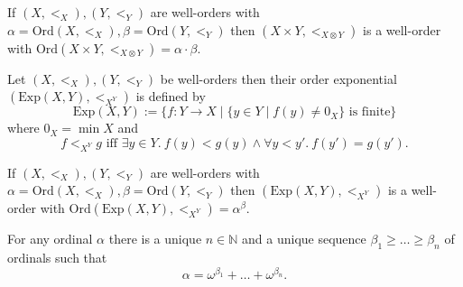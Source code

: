 \documentclass{whrartcl}
\newcommand{\NN}{\mathbb{N}}
\newcommand{\ord}{\text{Ord}}
\newcommand{\Exp}{\text{Exp}}
\begin{document}
\begin{proposition}
  If $(X, <_X), (Y, <_Y)$ are well-orders with $\alpha = \ord(X, <_X), \beta =
  \ord(Y, <_Y)$ then $(X \times Y, <_{X \otimes Y})$ is a well-order with $\ord(X \times Y,
  <_{X \otimes Y}) = \alpha \cdot \beta$.
\end{proposition}

\begin{definition}
  Let $(X, <_X), (Y, <_Y)$ be well-orders then their order exponential $(\Exp(X,
  Y), <_{X^Y})$ is defined by
  \[
    \Exp(X, Y) := \{f : Y \to X \mid \{y \in Y \mid f(y) \neq 0_X\} \text{ is finite} \}
  \]
  where $0_X = \min X$ and
  \[
    f <_{X^Y} g \text{ iff } \exists y \in Y.~f(y) < g(y) \wedge \forall y <
    y'.~f(y') = g(y').
  \]
\end{definition}

\begin{proposition}
  If $(X, <_X), (Y, <_Y)$ are well-orders with $\alpha = \ord(X, <_X), \beta =
  \ord(Y, <_Y)$ then $(\Exp(X, Y), <_{X^Y})$ is a well-order with $\ord(\Exp(X, Y),
  <_{X^Y}) = \alpha^\beta$.
\end{proposition}

\begin{theorem}
  For any ordinal $\alpha$ there is a unique $n \in \NN$ and a unique sequence
  $\beta_1 \geq \ldots \geq \beta_n$ of ordinals such that
  \[
    \alpha = \omega^{\beta_1} + \ldots + \omega^{\beta_n}.
  \]
\end{theorem}

\printbibliography{}
\end{document}

